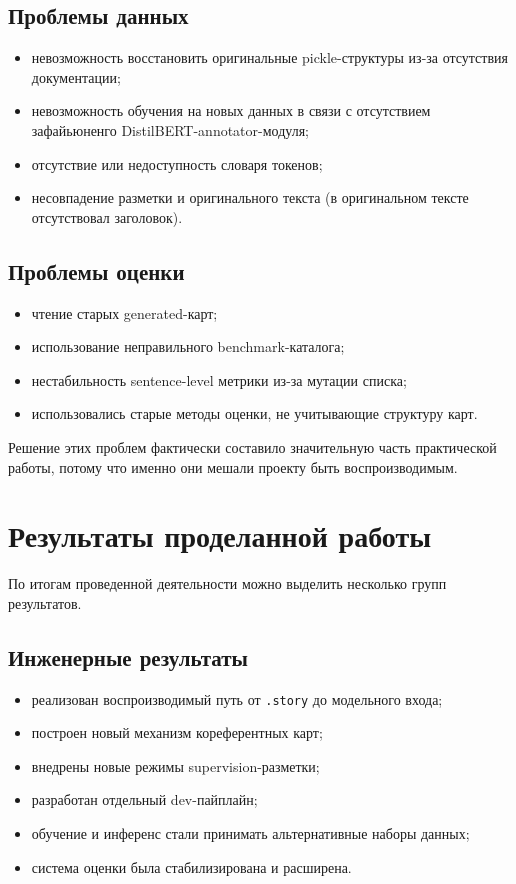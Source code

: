 \documentclass[12pt,a4paper]{article}
\begin{document}
\subsection{Проблемы данных}

\begin{itemize}
    \item невозможность восстановить оригинальные pickle-структуры из-за отсутствия документации;
    \item невозможность обучения на новых данных в связи с отсутствием зафайьюненго DistilBERT-annotator-модуля;
    \item отсутствие или недоступность словаря токенов;
    \item несовпадение разметки и оригинального текста (в оригинальном тексте отсутствовал заголовок).
\end{itemize}

\subsection{Проблемы оценки}

\begin{itemize}
    \item чтение старых generated-карт;
    \item использование неправильного benchmark-каталога;
    \item нестабильность sentence-level метрики из-за мутации списка;
    \item использовались старые методы оценки, не учитывающие структуру карт.
\end{itemize}

Решение этих проблем фактически составило значительную часть практической работы, потому
что именно они мешали проекту быть воспроизводимым.

\section{Результаты проделанной работы}

По итогам проведенной деятельности можно выделить несколько групп результатов.

\subsection{Инженерные результаты}

\begin{itemize}
    \item реализован воспроизводимый путь от \texttt{.story} до модельного входа;
    \item построен новый механизм кореферентных карт;
    \item внедрены новые режимы supervision-разметки;
    \item разработан отдельный dev-пайплайн;
    \item обучение и инференс стали принимать альтернативные наборы данных;
    \item система оценки была стабилизирована и расширена.
\end{itemize}
\end{document}
